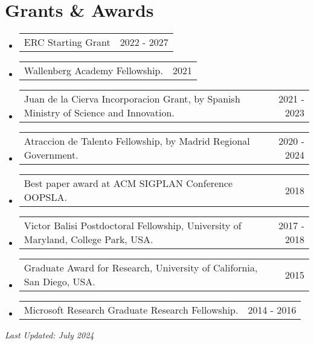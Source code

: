\documentclass[letterpaper,11pt]{article}
\makeatletter
\newcommand{\resumeProjectHeading}[2]{
    \item
    \begin{tabular*}{0.97\textwidth}{l@{\extracolsep{\fill}}r}
      \small#1 & #2 \\
    \end{tabular*}\vspace{-7pt}
}
\newcommand{\resumeSubHeadingListStart}{\begin{itemize}[leftmargin=0.15in, label={}]}
\newcommand{\resumeSubHeadingListEnd}{\end{itemize}}
\makeatother
\begin{document}
 \section{Grants \& Awards}
 \resumeSubHeadingListStart
 \resumeProjectHeading
     {ERC Starting Grant}{2022 - 2027}
 \resumeProjectHeading
     {Wallenberg Academy Fellowship.}{2021}
 \resumeProjectHeading
     {Juan de la Cierva Incorporacion Grant, by Spanish Ministry of Science and Innovation.}{2021 - 2023}
 \resumeProjectHeading
     {Atraccion de Talento Fellowship, by Madrid Regional Government.}{2020 - 2024}
 \resumeProjectHeading
     {Best paper award at ACM SIGPLAN Conference OOPSLA.}{2018}
 \resumeProjectHeading
     {Victor Balisi Postdoctoral Fellowship, University of Maryland, College Park, USA.}{2017 - 2018}
 \resumeProjectHeading
     {Graduate Award for Research, University of California, San Diego, USA.}{2015}
 \resumeProjectHeading
     {Microsoft Research Graduate Research Fellowship.}{2014 - 2016}
 \resumeSubHeadingListEnd
 
 \vspace*{\fill}
 \hfill \emph{Last Updated: July 2024}
\end{document}
